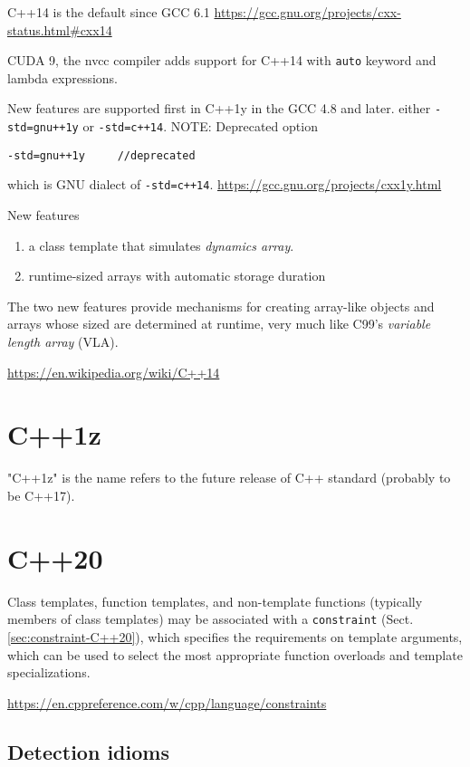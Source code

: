 C++14 is the default since GCC 6.1
\url{https://gcc.gnu.org/projects/cxx-status.html#cxx14}

CUDA 9, the nvcc compiler adds support for C++14 with \verb!auto! keyword and lambda expressions.
 


New features are supported first in C++1y in the GCC 4.8 and later.
either \verb!-std=gnu++1y! or \verb!-std=c++14!. NOTE: Deprecated option
\begin{verbatim}
-std=gnu++1y     //deprecated
\end{verbatim}
which is GNU dialect of \verb!-std=c++14!.
\url{https://gcc.gnu.org/projects/cxx1y.html}


New features
\begin{enumerate}
  \item a class template that simulates {\it dynamics array}.
  \item runtime-sized arrays with automatic storage duration
\end{enumerate}
The two new features provide mechanisms for creating array-like objects and
arrays whose sized are determined at runtime, very much like C99's {\it
variable length array} (VLA). 




\url{https://en.wikipedia.org/wiki/C++14}
\section{C++1z}
\label{sec:C++1z}

"C++1z" is the name refers to the future release of C++ standard (probably to be
C++17).

\section{C++20}


Class templates, function templates, and non-template functions (typically
members of class templates) may be associated with a \verb!constraint!
(Sect.\ref{sec:constraint-C++20}), which specifies the requirements on template
arguments, which can be used to select the most appropriate function overloads
and template specializations.

\url{https://en.cppreference.com/w/cpp/language/constraints}


\subsection{Detection idioms}

